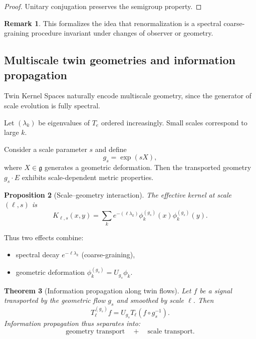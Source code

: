 \documentclass[11pt]{article}
\newtheorem{theorem}{Theorem}[section]
\newtheorem{proposition}[theorem]{Proposition}
\theoremstyle{definition}
\newtheorem{remark}[theorem]{Remark}
\begin{document}
\begin{proof}
	Unitary conjugation preserves the semigroup property.
\end{proof}

\begin{remark}
	This formalizes the idea that renormalization is a spectral coarse-graining procedure invariant under changes of observer or geometry.
\end{remark}

\subsection{Multiscale twin geometries and information propagation}

Twin Kernel Spaces naturally encode multiscale geometry, since the generator of scale evolution is fully spectral.

Let $(\lambda_k)$ be eigenvalues of $T_e$ ordered increasingly.
Small scales correspond to large $k$.

Consider a scale parameter $s$ and define
\[
g_s = \exp(sX),
\]
where $X\in\mathfrak{g}$ generates a geometric deformation.
Then the transported geometry $g_s\cdot E$ exhibits scale-dependent metric properties.

\begin{proposition}[Scale–geometry interaction]
	The effective kernel at scale $(\ell,s)$ is
	\[
	K_{\ell,s}(x,y)
	= \sum_{k} e^{-(\ell\lambda_k)} \phi_k^{(g_s)}(x)\phi_k^{(g_s)}(y).
	\]
\end{proposition}

Thus two effects combine:
\begin{itemize}
	\item spectral decay $e^{-\ell\lambda_k}$ (coarse-graining),
	\item geometric deformation $\phi_k^{(g_s)}=U_{g_s}\phi_k$.
\end{itemize}

\begin{theorem}[Information propagation along twin flows]
	Let $f$ be a signal transported by the geometric flow $g_s$ and smoothed by scale $\ell$.
	Then
	\[
	T_\ell^{(g_s)} f = U_{g_s} T_\ell (f\circ g_s^{-1}).
	\]
	Information propagation thus separates into:
	\[
	\text{geometry transport} \quad+\quad \text{scale transport}.
	\]
\end{theorem}
\end{document}
